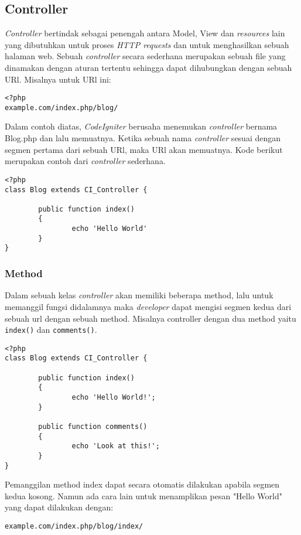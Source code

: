 \subsection{Controller}
\textit{Controller} bertindak sebagai penengah antara Model, View dan \textit{resources} lain yang dibutuhkan untuk proses \textit{HTTP requests} dan untuk menghasilkan sebuah halaman web. Sebuah \textit{controller} secara sederhana merupakan sebuah file yang dinamakan dengan aturan tertentu sehingga dapat dihubungkan dengan sebuah URl.
Misalnya untuk URl ini:
\begin{lstlisting}[frame=single] 
<?php
example.com/index.php/blog/
\end{lstlisting}

Dalam contoh diatas, \textit{CodeIgniter} berusaha menemukan \textit{controller} bernama Blog.php dan lalu memuatnya. Ketika sebuah nama \textit{controller} sesuai dengan segmen pertama dari sebuah URl, maka URl akan memuatnya. Kode berikut merupakan contoh dari \textit{controller} sederhana.
\begin{lstlisting}[frame=single] 
<?php
class Blog extends CI_Controller {

        public function index()
        {
                echo 'Hello World'
        }
}
\end{lstlisting} 

\subsubsection{Method}
Dalam sebuah kelas \textit{controller} akan memiliki beberapa method, lalu untuk memanggil fungsi didalamnya maka \textit{developer} dapat mengisi segmen kedua dari sebuah url dengan sebuah method. Misalnya controller dengan dua method yaitu \texttt{index()} dan \texttt{comments()}.
\begin{lstlisting}[frame=single] 
<?php
class Blog extends CI_Controller {

        public function index()
        {
                echo 'Hello World!';
        }

        public function comments()
        {
                echo 'Look at this!';
        }
}
\end{lstlisting}

\noindent Pemanggilan method index dapat secara otomatis dilakukan apabila segmen kedua kosong. Namun ada cara lain untuk menamplikan pesan "Hello World" yang dapat dilakukan dengan:

\begin{lstlisting}[frame=single] 
example.com/index.php/blog/index/
\end{lstlisting}

